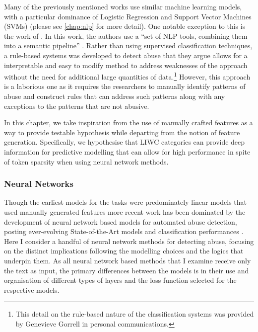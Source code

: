 Many of the previously mentioned works use similar machine learning models, with a particular dominance of Logistic Regression and Support Vector Machines (SVMs) (please see \cref{chap:nlp} for more detail). One notable exception to this is the work of \citet{Gorrell:2018}. In this work, the authors use a ``set of NLP tools, combining them into a semantic pipeline'' \citep[pp. 601]{Gorrell:2018}. Rather than using supervised classification techniques, a rule-based systems was developed to detect abuse that they argue allows for a interpretable and easy to modify method to address weaknesses of the approach without the need for additional large quantities of data.\footnote{This detail on the rule-based nature of the classification systems was provided by Genevieve Gorrell in personal communications.} However, this approach is a laborious one as it requires the researchers to manually identify patterns of abuse and construct rules that can address such patterns along with any exceptions to the patterns that are not abusive.
\vspace{5mm}

In this chapter, we take inspiration from the use of manually crafted features as a way to provide testable hypothesis while departing from the notion of feature generation. Specifically, we hypothesise that LIWC categories can provide deep information for predictive modelling that can allow for high performance in spite of token sparsity when using neural network methods.

\subsubsection{Neural Networks}\label{sec:liwc_nn}
Though the earliest models for the tasks were predominately linear models that used manually generated features \citep{Waseem-Hovy:2016,Davidson:2017,Warner:2012} more recent work has been dominated by the development of neural network based models for automated abuse detection, posting ever-evolving State-of-the-Art models and classification performances \citep[e.g.]{Park:2017,Badjatiya:2017,Zimmerman:2018,Stoop:2019,Isaksen:2020}. Here I consider a handful of neural network methods for detecting abuse, focusing on the distinct implications following the modelling choices and the logics that underpin them. As all neural network based methods that I examine receive only the text as input, the primary differences between the models is in their use and organisation of different types of layers and the loss function selected for the respective models.

